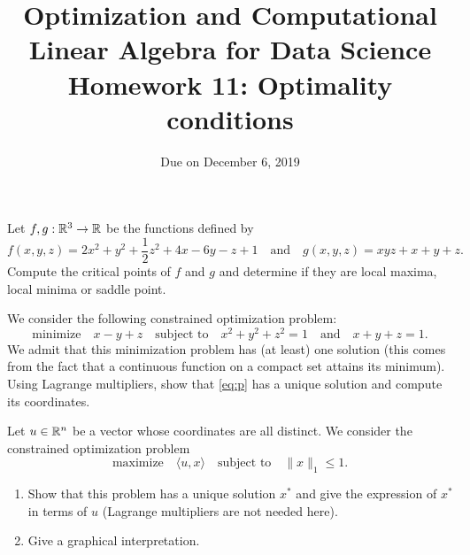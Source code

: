 \documentclass[11pt,nocut]{article}
\title{\vspace{-2.0cm}%
	Optimization and Computational Linear Algebra for Data Science\\
Homework 11: Optimality conditions}
\date{\vspace{-1cm}Due on December 6, 2019}
\begin{document}
\maketitle


\vspace{1mm}

\begin{problem}[2 points]
	Let $f,g: \mathbb{R}^3 \to \mathbb{R}$ be the functions defined by
	$$
	f(x,y,z) = 2x^2 + y^2 + \frac{1}{2} z^2 + 4x - 6y - z + 1
	\quad \text{and} \quad
	g(x,y,z) = xyz + x+y+z .
	$$
	Compute the critical points of $f$ and $g$ and determine if they are local maxima, local minima or saddle point.
\end{problem}

\vspace{5mm}

\begin{problem}[3 points]
	We consider the following constrained optimization problem:
	\begin{equation}\label{eq:p}
	\text{minimize} \quad x-y+z \quad \text{subject to} \quad x^2 + y^2 + z^2=1 \quad \text{and} \quad x+y+z=1.
	\end{equation}
	We admit that this minimization problem has (at least) one solution (this comes from the fact that a continuous function on a compact set attains its minimum).
	\\

		Using Lagrange multipliers, show that \eqref{eq:p} has a unique solution and compute its coordinates.
\end{problem}

\vspace{5mm}

\begin{problem}[2 points]
	Let $u \in \mathbb{R}^n$ be a vector whose coordinates are all distinct. We consider the constrained optimization problem
	$$
	\text{maximize} \quad \langle u ,x \rangle \quad \text{subject to} \quad \|x\|_1 \leq 1.
	$$
	\begin{enumerate}[label=\normalfont(\textbf{\alph*})]
		\item Show that this problem has a unique solution $x^*$ and give the expression of $x^*$ in terms of $u$ (Lagrange multipliers are not needed here).
		\item Give a graphical interpretation.
	\end{enumerate}
\end{problem}

\newpage
\end{document}
